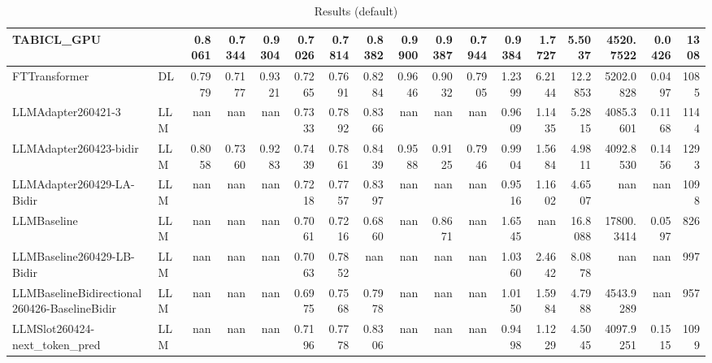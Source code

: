\begin{table}[htbp]
{\begin{tabular}{ll|rrrrrrrrrrrrrr|r}
TABICL\_GPU &  & 0.8061 & 0.7344 & 0.9304 & 0.7026 & 0.7814 & 0.8382 & 0.9900 & \textbf{0.9387} & 0.7944 & 0.9384 & 1.7727 & 5.5037 & 4520.7522 & 0.0426 & 1308 \\
\midrule
FTTransformer & DL & 0.7979 & 0.7177 & 0.9321 & 0.7265 & 0.7691 & 0.8284 & 0.9646 & 0.9032 & 0.7905 & 1.2399 & 6.2144 & 12.2853 & 5202.0828 & 0.0497 & 1085 \\
LLMAdapter260421-3 & LLM & nan & nan & nan & 0.7333 & 0.7892 & 0.8366 & nan & nan & nan & 0.9609 & 1.1435 & 5.2815 & 4085.3601 & 0.1168 & 1144 \\
LLMAdapter260423-bidir & LLM & 0.8058 & 0.7360 & 0.9283 & 0.7439 & 0.7861 & 0.8439 & 0.9588 & 0.9125 & 0.7946 & 0.9904 & 1.5684 & 4.9811 & 4092.8530 & 0.1456 & 1293 \\
LLMAdapter260429-LA-Bidir & LLM & nan & nan & nan & 0.7218 & 0.7757 & 0.8397 & nan & nan & nan & 0.9516 & 1.1602 & 4.6507 & nan & nan & 1098 \\
LLMBaseline & LLM & nan & nan & nan & 0.7061 & 0.7216 & 0.6860 & nan & 0.8671 & nan & 1.6545 & nan & 16.8088 & 17800.3414 & 0.0597 & 826 \\
LLMBaseline260429-LB-Bidir & LLM & nan & nan & nan & 0.7063 & 0.7852 & nan & nan & nan & nan & 1.0360 & 2.4642 & 8.0878 & nan & nan & 997 \\
LLMBaselineBidirectional260426-BaselineBidir & LLM & nan & nan & nan & 0.6975 & 0.7568 & 0.7978 & nan & nan & nan & 1.0150 & 1.5984 & 4.7988 & 4543.9289 & nan & 957 \\
LLMSlot260424-next\_token\_pred & LLM & nan & nan & nan & 0.7196 & 0.7778 & 0.8306 & nan & nan & nan & 0.9498 & 1.1229 & 4.5045 & 4097.9251 & 0.1515 & 1099 \\
\bottomrule
\end{tabular}
}
\caption{Results (default)}
\label{tab:results_default}
\end{table}